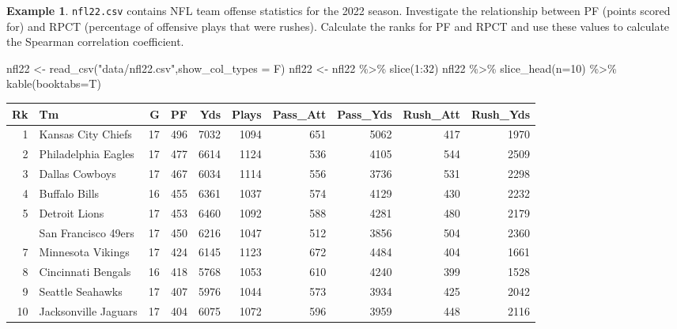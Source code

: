 \documentclass[
  11pt,
]{book}
\newenvironment{Shaded}{\begin{snugshade}}{\end{snugshade}}
\newcommand{\AttributeTok}[1]{\textcolor[rgb]{0.77,0.63,0.00}{#1}}
\newcommand{\DecValTok}[1]{\textcolor[rgb]{0.00,0.00,0.81}{#1}}
\newcommand{\FunctionTok}[1]{\textcolor[rgb]{0.00,0.00,0.00}{#1}}
\newcommand{\NormalTok}[1]{#1}
\newcommand{\OtherTok}[1]{\textcolor[rgb]{0.56,0.35,0.01}{#1}}
\newcommand{\SpecialCharTok}[1]{\textcolor[rgb]{0.00,0.00,0.00}{#1}}
\newcommand{\StringTok}[1]{\textcolor[rgb]{0.31,0.60,0.02}{#1}}
\theoremstyle{definition}
\theoremstyle{definition}
\newtheorem{example}{Example}[chapter]
\theoremstyle{definition}
\theoremstyle{definition}
\theoremstyle{remark}
\begin{document}
\begin{example}
\texttt{nfl22.csv} contains NFL team offense statistics for the 2022 season. Investigate the relationship between PF (points scored for) and RPCT (percentage of offensive plays that were rushes). Calculate the ranks for PF and RPCT and use these values to calculate the Spearman correlation coefficient.
\end{example}

\begin{Shaded}
\begin{Highlighting}[]
\NormalTok{nfl22 }\OtherTok{\textless{}{-}} \FunctionTok{read\_csv}\NormalTok{(}\StringTok{"data/nfl22.csv"}\NormalTok{,}\AttributeTok{show\_col\_types =}\NormalTok{ F)}
\NormalTok{nfl22 }\OtherTok{\textless{}{-}}\NormalTok{ nfl22 }\SpecialCharTok{\%\textgreater{}\%} \FunctionTok{slice}\NormalTok{(}\DecValTok{1}\SpecialCharTok{:}\DecValTok{32}\NormalTok{)}
\NormalTok{nfl22 }\SpecialCharTok{\%\textgreater{}\%} \FunctionTok{slice\_head}\NormalTok{(}\AttributeTok{n=}\DecValTok{10}\NormalTok{) }\SpecialCharTok{\%\textgreater{}\%} \FunctionTok{kable}\NormalTok{(}\AttributeTok{booktabs=}\NormalTok{T)}
\end{Highlighting}
\end{Shaded}

\begin{tabular}{rlrrrrrrrr}
\toprule
Rk & Tm & G & PF & Yds & Plays & Pass\_Att & Pass\_Yds & Rush\_Att & Rush\_Yds\\
\midrule
1 & Kansas City Chiefs & 17 & 496 & 7032 & 1094 & 651 & 5062 & 417 & 1970\\
2 & Philadelphia Eagles & 17 & 477 & 6614 & 1124 & 536 & 4105 & 544 & 2509\\
3 & Dallas Cowboys & 17 & 467 & 6034 & 1114 & 556 & 3736 & 531 & 2298\\
4 & Buffalo Bills & 16 & 455 & 6361 & 1037 & 574 & 4129 & 430 & 2232\\
5 & Detroit Lions & 17 & 453 & 6460 & 1092 & 588 & 4281 & 480 & 2179\\
\addlinespace
6 & San Francisco 49ers & 17 & 450 & 6216 & 1047 & 512 & 3856 & 504 & 2360\\
7 & Minnesota Vikings & 17 & 424 & 6145 & 1123 & 672 & 4484 & 404 & 1661\\
8 & Cincinnati Bengals & 16 & 418 & 5768 & 1053 & 610 & 4240 & 399 & 1528\\
9 & Seattle Seahawks & 17 & 407 & 5976 & 1044 & 573 & 3934 & 425 & 2042\\
10 & Jacksonville Jaguars & 17 & 404 & 6075 & 1072 & 596 & 3959 & 448 & 2116\\
\bottomrule
\end{tabular}
\end{document}
